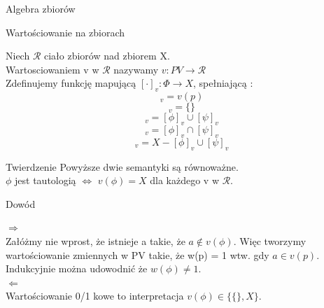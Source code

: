 \documentclass{beamer}
\begin{document}
\begin{frame}{Algebra zbiorów}
 \begin{block}{Wartościowanie na zbiorach}
 
 Niech \( \mathcal{R} \) ciało zbiorów nad zbiorem X.\\  	Wartosciowaniem v w \( \mathcal{R} \) nazywamy \( v : PV \rightarrow \mathcal{R}\)\\
 Zdefinujemy funkcję mapującą  \( [ \cdot ]_v : \Phi \rightarrow X\), spełniającą :
 \begin{equation*}
 	[p]_v = v ( p)
 \end{equation*} 
 \begin{equation*}
 	[\bot]_v = \{\}
 \end{equation*} 
  \begin{equation*}
 	[\phi \vee \psi]_v = [\phi]_v \cup [\psi]_v
 \end{equation*}
  \begin{equation*}
 	[\phi \wedge \psi]_v = [\phi]_v \cap [\psi]_v 
 \end{equation*}
  \begin{equation*}
 	[\phi \rightarrow \psi]_v = X-[\phi]_v \cup [\psi]_v
 \end{equation*}
 	
 \end{block}
 
\end{frame}

\begin{frame}

\begin{block}{Twierdzenie}
 	Powyższe dwie semantyki są równoważne.\\ \( \phi\) jest tautologią \( \Leftrightarrow \) \(v(\phi) = X \) dla każdego v w \(\mathcal{R}\).
 \end{block}
 \begin{block}{Dowód}
 
	\( \Rightarrow \)\\
	Załóżmy nie wprost, że istnieje a takie, że \( a \notin v(\phi)\). Więc tworzymy wartościowanie zmiennych w PV takie, że w(p) = 1 wtw. gdy \( a \in v(p)\). Indukcyjnie można udowodnić że \(w(\phi) \neq 1\).\\
	\( \Leftarrow \) \\
	Wartościowanie 0/1 kowe to interpretacja \( v (\phi) \in \{\{\}, X\} \).
 \end{block}
 
\end{frame}
\end{document}
